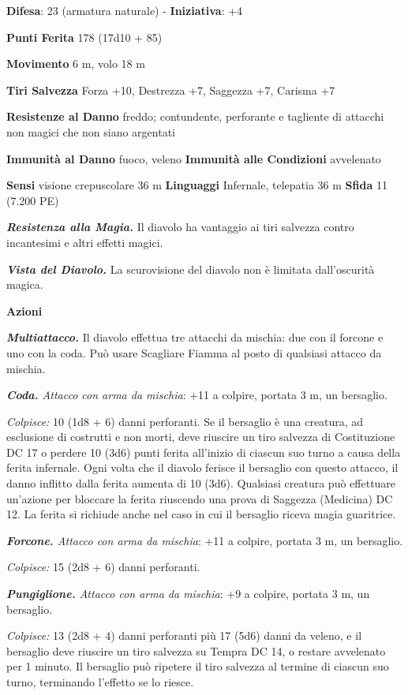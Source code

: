 \begin{multicols}{2}
\textbf{Difesa}: 23 (armatura naturale) - \textbf{Iniziativa}: +4

\textbf{Punti Ferita} 178 (17d10 + 85)

\textbf{Movimento} 6 m, volo 18 m

\textbf{Tiri Salvezza} Forza +10, Destrezza +7, Saggezza +7, Carisma +7

\textbf{Resistenze al Danno} freddo; contundente, perforante e tagliente
di attacchi non magici che non siano argentati

\textbf{Immunità al Danno} fuoco, veleno \textbf{Immunità alle
Condizioni} avvelenato

\textbf{Sensi} visione crepuscolare 36 m
\textbf{Linguaggi} Infernale, telepatia 36 m \textbf{Sfida} 11 (7.200
PE)

\emph{\textbf{Resistenza alla Magia.}} Il diavolo ha vantaggio ai tiri
salvezza contro incantesimi e altri effetti magici.

\emph{\textbf{Vista del Diavolo.}} La scurovisione del diavolo non è
limitata dall'oscurità magica.

\textbf{Azioni}

\emph{\textbf{Multiattacco.}} Il diavolo effettua tre attacchi da
mischia: due con il forcone e uno con la coda. Può usare Scagliare
Fiamma al posto di qualsiasi attacco da mischia.

\emph{\textbf{Coda.} Attacco con arma da mischia}: +11 a colpire,
portata 3 m, un bersaglio.

\emph{Colpisce:} 10 (1d8 + 6) danni perforanti. Se il bersaglio è una
creatura, ad esclusione di costrutti e non morti, deve riuscire un tiro
salvezza di Costituzione DC 17 o perdere 10 (3d6) punti ferita
all'inizio di ciascun suo turno a causa della ferita infernale. Ogni
volta che il diavolo ferisce il bersaglio con questo attacco, il danno
inflitto dalla ferita aumenta di 10 (3d6). Qualsiasi creatura può
effettuare un'azione per bloccare la ferita riuscendo una prova di
Saggezza (Medicina) DC 12. La ferita si richiude anche nel caso in cui
il bersaglio riceva magia guaritrice.

\emph{\textbf{Forcone.} Attacco con arma da mischia}: +11 a colpire,
portata 3 m, un bersaglio.

\emph{Colpisce:} 15 (2d8 + 6) danni perforanti.

\emph{\textbf{Pungiglione.} Attacco con arma da mischia}: +9 a colpire,
portata 3 m, un bersaglio.

\emph{Colpisce:} 13 (2d8 + 4) danni perforanti più 17 (5d6) danni da
veleno, e il bersaglio deve riuscire un tiro salvezza su Tempra DC
14, o restare avvelenato per 1 minuto. Il bersaglio può ripetere il tiro
salvezza al termine di ciascun suo turno, terminando l'effetto se lo
riesce.


\end{multicols}
